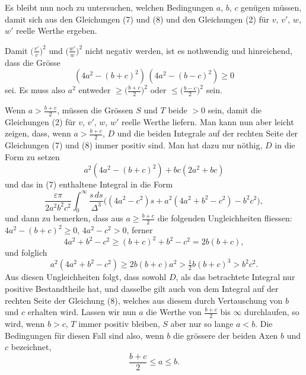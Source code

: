 \documentclass[12pt,a4paper]{book}
\theoremstyle{definition}
\theoremstyle{remark}
\begin{document}
Es bleibt nun noch zu untersuchen, welchen Bedingungen $a$, $b$, $c$ genügen müssen, damit sich aus den Gleichungen (7) und (8) und den Gleichungen (2) für $v$, $v'$, $w$, $w'$ reelle Werthe ergeben.

Damit $\bigl(\frac{v'}{v}\bigr)^2$ und $\bigl(\frac{w'}{w}\bigr)^2$ nicht negativ werden, ist es nothwendig und hinreichend, dass die Grösse
\[ (4a^2 - (b+c)^2)\,(4a^2 - (b-c)^2) \geq 0 \]
sei. Es muss also $a^2$ entweder $\geq\bigl(\frac{b+c}{2}\bigr)^2$ oder $\leq\bigl(\frac{b-c}{2}\bigr)^2$ sein.

Wenn $a > \frac{b+c}{2}$, müssen die Grössen $S$ und $T$ beide $> 0$ sein, damit die Gleichungen (2) für $v$, $v'$, $w$, $w'$ reelle Werthe liefern. Man kann nun aber leicht zeigen, dass, wenn $a > \frac{b+c}{2}$, $D$ und die beiden Integrale auf der rechten Seite der Gleichungen (7) und (8) immer positiv sind. Man hat dazu nur nöthig, $D$ in die Form zu setzen
\[ a^2(4a^2 - (b+c)^2) + bc(2a^2 + bc) \]
und das in (7) enthaltene Integral in die Form
\[ \frac{\varepsilon\pi}{2a^2b^2c^2}\int_0^{\infty}\!\frac{s\,ds}{\Delta^3}\bigl((4a^2-c^2)s + a^2(4a^2+b^2-c^2) - b^2c^2\bigr), \]
und dann zu bemerken, dass aus $a \geq \frac{b+c}{2}$ die folgenden Ungleichheiten fliessen: $4a^2 - (b+c)^2 \geq 0$, $4a^2 - c^2 > 0$, ferner
\[ 4a^2 + b^2 - c^2 \geq (b+c)^2 + b^2 - c^2 = 2b(b+c), \]
und folglich
\[ a^2(4a^2 + b^2 - c^2) \geq 2b(b+c)a^2 > \tfrac{1}{2}b(b+c)^3 > b^2c^2. \]
Aus diesen Ungleichheiten folgt, dass sowohl $D$, als das betrachtete Integral nur positive Bestandtheile hat, und dasselbe gilt auch von dem Integral auf der rechten Seite der Gleichung (8), welches aus diesem durch Vertauschung von $b$ und $c$ erhalten wird. Lassen wir nun $a$ die Werthe von $\frac{b+c}{2}$ bis $\infty$ durchlaufen, so wird, wenn $b > c$, $T$ immer positiv bleiben, $S$ aber nur so lange $a < b$. Die Bedingungen für diesen Fall sind also, wenn $b$ die grössere der beiden Axen $b$ und $c$ bezeichnet,
\begin{equation}
\tag{I} \frac{b+c}{2} \leq a \leq b. \end{equation}
\end{document}
